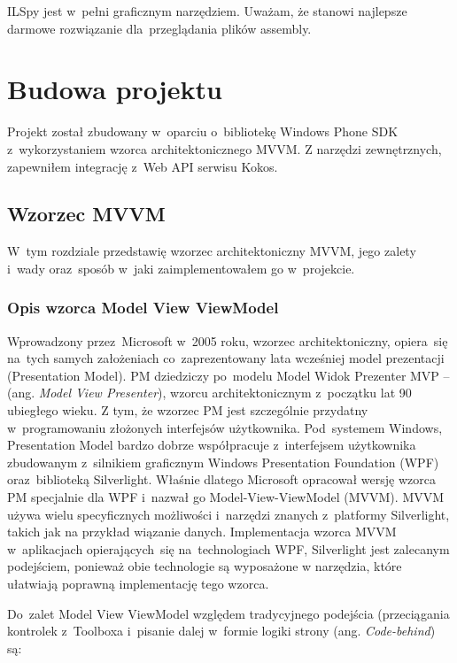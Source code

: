 \documentclass[a4paper,twoside,titlepage,openright]{book}
\begin{document}
ILSpy jest w~pełni graficznym narzędziem. Uważam, że stanowi najlepsze darmowe rozwiązanie dla~przeglądania plików assembly.


\chapter{Budowa projektu}
Projekt został zbudowany w~oparciu o~bibliotekę Windows Phone SDK z~wykorzystaniem wzorca architektonicznego MVVM. Z narzędzi zewnętrznych, zapewniłem integrację z~Web API serwisu Kokos.

\section{Wzorzec MVVM}
W~tym rozdziale przedstawię wzorzec architektoniczny MVVM, jego zalety i~wady oraz~sposób w~jaki zaimplementowałem go w~projekcie.

\subsection{Opis wzorca Model View ViewModel}

Wprowadzony przez~Microsoft w~2005 roku, wzorzec architektoniczny, opiera~się na~tych samych założeniach co~zaprezentowany lata wcześniej model prezentacji (Presentation Model). PM dziedziczy po~modelu Model Widok Prezenter MVP -- (ang. \textit{Model View Presenter}), wzorcu architektonicznym z~początku lat 90 ubiegłego wieku. Z tym, że wzorzec PM jest szczególnie przydatny w~programowaniu złożonych interfejsów użytkownika. Pod~systemem Windows, Presentation Model bardzo dobrze współpracuje z~interfejsem użytkownika zbudowanym z~silnikiem graficznym Windows Presentation Foundation (WPF) oraz~biblioteką Silverlight. Właśnie dlatego Microsoft opracował wersję wzorca PM specjalnie dla WPF i~nazwał go Model-View-ViewModel (MVVM).\cite{aspNet} MVVM używa wielu specyficznych możliwości i~narzędzi znanych z~platformy Silverlight, takich jak na przykład wiązanie danych. Implementacja wzorca MVVM w~aplikacjach opierających~się na~technologiach WPF, Silverlight jest zalecanym podejściem, ponieważ obie technologie są wyposażone w narzędzia, które ułatwiają poprawną implementację tego wzorca.

Do~zalet Model View ViewModel względem tradycyjnego podejścia (przeciągania kontrolek z~Toolboxa i~pisanie dalej w~formie logiki strony (ang. \textit{Code-behind}) są:
\end{document}

